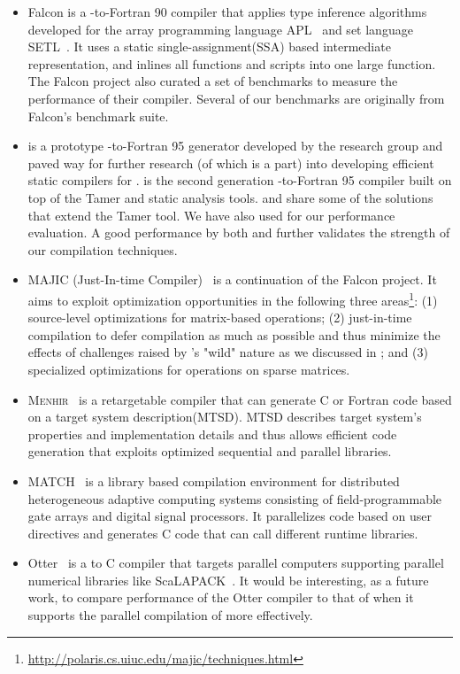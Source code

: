 \begin{itemize}
\item Falcon is a \matlab-to-Fortran 90 compiler that applies type inference
algorithms developed for the array programming language
APL~\cite{magica,805380,801218} and set
language SETL~\cite{361235}. It uses a static single-assignment(SSA) based
intermediate representation, and inlines all functions and scripts into one
large function. The Falcon project also curated a set of \matlab benchmarks to
measure the performance of their compiler. Several of our benchmarks are
originally from Falcon's benchmark suite.
\item \mcfor is a prototype \matlab-to-Fortran 95 generator developed by the
\mclab research group and paved way for further research (of which \mixten is a
part) into developing efficient static \matlab compilers for \matlab. \mctwofor
is the second generation \matlab-to-Fortran 95 compiler built on top of the
Tamer and \mcsaf static analysis tools. \mixten and \mctwofor share some of the
solutions that extend the Tamer tool. We have also used \mctwofor for our
performance evaluation. A good performance by both \mixten and \mctwofor further
validates the strength of our compilation techniques.
\item MAJIC (\matlab Just-In-time Compiler)~\cite{MaJIC} is a continuation of the
Falcon project. It aims to exploit optimization opportunities in the following
three areas\footnote{\url{http://polaris.cs.uiuc.edu/majic/techniques.html}}:
(1) source-level optimizations for matrix-based operations; (2) just-in-time
compilation to defer compilation as much as possible and thus minimize the
effects of challenges raised by \matlab's "wild" nature as we discussed in
; and (3) specialized optimizations for operations on
sparse matrices.
\item \textsc{Menhir}~\cite{745866} is a retargetable \matlab compiler that can
generate C or Fortran code based on a target system description(MTSD). MTSD
describes target system's properties and implementation details and thus allows
efficient code generation that exploits optimized sequential and parallel
libraries. 
\item MATCH~\cite{MAT2C} is a library based compilation environment for distributed
heterogeneous adaptive computing systems consisting of field-programmable gate
arrays and digital signal processors. It parallelizes \matlab code based on user
directives and generates C code that can call different runtime libraries. 
\item Otter~\cite{Quinn} is a \matlab to C compiler that targets parallel computers
supporting parallel numerical libraries like ScaLAPACK~\cite{898821}. It would be interesting,
as a future work, to compare performance of the Otter compiler to that of
\mixten when it supports the parallel compilation of \matlab more effectively.
\end{itemize}      

